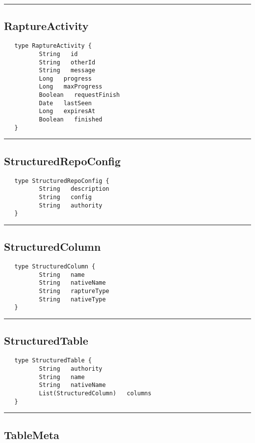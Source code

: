\rule{15cm}{2pt}
\subsection{RaptureActivity}
\label{type:RaptureActivity}

\begin{verbatim}
   type RaptureActivity {
          String   id
          String   otherId
          String   message
          Long   progress
          Long   maxProgress
          Boolean   requestFinish
          Date   lastSeen
          Long   expiresAt
          Boolean   finished
   }
\end{verbatim}

\rule{15cm}{2pt}
\subsection{StructuredRepoConfig}
\label{type:StructuredRepoConfig}

\begin{verbatim}
   type StructuredRepoConfig {
          String   description
          String   config
          String   authority
   }
\end{verbatim}

\rule{15cm}{2pt}
\subsection{StructuredColumn}
\label{type:StructuredColumn}

\begin{verbatim}
   type StructuredColumn {
          String   name
          String   nativeName
          String   raptureType
          String   nativeType
   }
\end{verbatim}

\rule{15cm}{2pt}
\subsection{StructuredTable}
\label{type:StructuredTable}

\begin{verbatim}
   type StructuredTable {
          String   authority
          String   name
          String   nativeName
          List(StructuredColumn)   columns
   }
\end{verbatim}

\rule{15cm}{2pt}
\subsection{TableMeta}
\label{type:TableMeta}

